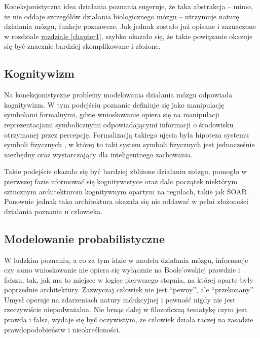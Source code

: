 Koneksjonistyczna idea działania poznania sugeruje, że taka abstrakcja -- mimo, że nie oddaje szczegółów działania biologicznego mózgu -- utrzymuje naturę działania mózgu, funkcje poznawcze.
Jak jednak zostało już opisane i zaznaczone w rozdziale \hyperref[chapter1]{rozdziale \ref*{chapter1}}, szybko okazało się, że takie powiązanie okazuje się być znacznie bardziej skomplikowane i złożone.

\subsection{Kognitywizm}

Na koneksjonistyczne problemy modelowania działania mózgu odpowiada kognitywizm.
W tym podejściu poznanie definiuje się jako manipulację symbolami formalnymi, gdzie wnioskowanie opiera się na manipulacji reprezentacjami symbolicznymi odpowiadającymi informacji o środowisku otrzymanej przez percepcję.
Formalizacją takiego ujęcia była hipoteza systemu symboli fizycznych \cite{newell2007computer}, w której to taki system symboli fizycznych jest jednocześnie niezbędny oraz wystarczający dla inteligentnego zachowania.

Takie podejście okazało się być bardziej zbliżone działaniu mózgu, pomogło w pierwszej fazie uformować się kognitywistyce oraz dało początek niektórym sztucznym architekturom kognitywnym opartym na regułach, takie jak SOAR \cite{laird2019soar}\footnotemark.
Ponownie jednak taka architektura okazała się nie oddawać w pełni złożoności działania poznania u człowieka.

\subsection{Modelowanie probabilistyczne}

W ludzkim poznaniu, a co za tym idzie w modelu działania mózgu, informacje czy samo wnioskowanie nie opiera się wyłącznie na Boole'owskiej prawdzie i fałszu, tak, jak ma to miejsce w logice pierwszego stopnia, na której oparte były poprzednie architektury.
Zazwyczaj człowiek nie jest ``pewny'', ale ``przekonany''.
Umysł operuje na zdarzeniach natury indukcyjnej i pewność nigdy nie jest rzeczywiście niepodważalna.
Nie brnąc dalej w filozoficzną tematykę czym jest prawda i fałsz, wydaje się być oczywistym, że człowiek działa raczej na zasadzie prawdopodobieństw i nieokreśloności.

